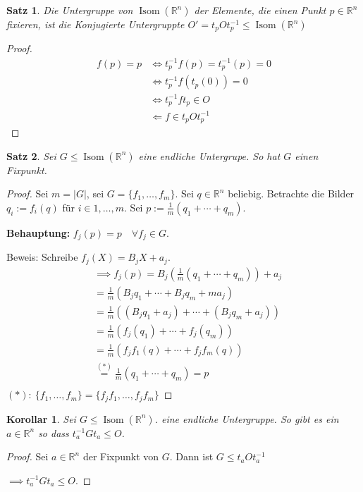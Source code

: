 \documentclass{article}
\theoremstyle{plain}
\newtheorem{theorem}{Satz}
\newtheorem{corollary}{Korollar}
\newcommand{\defeq}{:=}
\newcommand{\R}{\mathbb{R}}
\newcommand{\ug}{\leq}
\newcommand{\isom}{\mathop\text{Isom}}
\begin{document}
\begin{theorem}
    Die Untergruppe von $\isom(\R^n)$ der Elemente, die einen Punkt $p\in\R^n$ fixieren, ist die  Konjugierte Untergruppte $O'=t_pOt_p^{-1}\ug \isom(\R^n)$
\end{theorem}
\begin{proof}
    \begin{align*}
        f(p) = p &\Leftrightarrow t_p^{-1}f(p)=t_p^{-1}(p)=0\\
        &\Leftrightarrow t_p^{-1}f(t_p(0))=0\\
        &\Leftrightarrow t_p^{-1}ft_p\in O\\
        &\Leftarrow f\in t_p O t_p^{-1}
    \end{align*}
\end{proof}

\begin{theorem}
    Sei $G\ug \isom(\R^n)$ eine endliche Untergrupe. So hat $G$ einen Fixpunkt.
\end{theorem}
\begin{proof}
    Sei $m=|G|$, sei $G=\{f_1,\ldots,f_m\}$.
    Sei $q\in\R^n$ beliebig.
    Betrachte die Bilder  $q_i\defeq f_i(q)$ für $i\in 1,\ldots,m$.
    Sei $p\defeq \frac{1}{m}(q_1+\cdots+q_m)$.
    
    \textbf{Behauptung:} $f_j(p)=p\quad \forall f_j\in G$. 
    
    Beweis: Schreibe $f_j(X)=B_jX+a_j$.
    \begin{align*}
        &\implies f_j(p)=B_j(\frac{1}{m}(q_1+\cdots+q_m))+a_j\\
        &=\frac{1}{m}(B_jq_1+\cdots+B_jq_m+ma_j)\\
        &=\frac{1}{m}((B_jq_1+a_j)+\cdots+(B_jq_m+a_j))\\
        &=\frac{1}{m}(f_j(q_1)+\cdots+f_j(q_m))\\
        &=\frac{1}{m}(f_jf_1(q)+\cdots+f_jf_m(q))\\
        &\overset{(*)}{=}\frac{1}{m}(q_1+\cdots+q_m)=p\\
    \end{align*}
    $(*):\ \{f_1,\ldots,f_m\}=\{f_jf_1,\ldots,f_jf_m\}$
\end{proof}

\begin{corollary}
    Sei $G\ug\isom(\R^n)$. eine endliche Untergruppe. So gibt es ein $a\in\R^n$ so dass $t_a^{-1}Gt_a\ug O$.
\end{corollary}
\begin{proof}
    Sei $a\in \R^n$ der Fixpunkt von $G$. Dann ist $G\ug t_aOt_a^{-1}$
    
    $\implies t_a^{-1}Gt_a\ug O$.
\end{proof}
\end{document}
